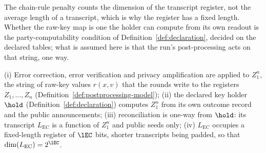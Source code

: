 
The chain-rule penalty counts the dimension of the transcript register, not
the average length of a transcript, which is why the register has a fixed
length. Whether the raw-key map is one the holder can compute from its own
readout is the party-computability condition of
Definition~\ref{def:declaration}, decided on the declared tables; what is
assumed here is that the run's post-processing acts on that string, one way.

\begin{assumption}\label{ass:keyreg}
(i) Error correction, error verification and privacy amplification are
applied to $Z_1^n$, the string of raw-key values $r(x,v)$ that the rounds
write to the registers $Z_1,\dots,Z_n$
(Definition~\ref{def:postprocessing-model});
(ii) the declared key holder $\hold$ (Definition~\ref{def:declaration})
computes $Z_1^n$ from its own outcome record and the public announcements;
(iii) reconciliation is one-way from $\hold$: its transcript
$L_{\mathrm{EC}}$ is a function of $Z_1^n$ and public seeds only;
(iv) $L_{\mathrm{EC}}$ occupies a fixed-length register of $\lEC$ bits,
shorter transcripts being padded, so that $\dim(L_{\mathrm{EC}})=2^{\lEC}$.
\end{assumption}
